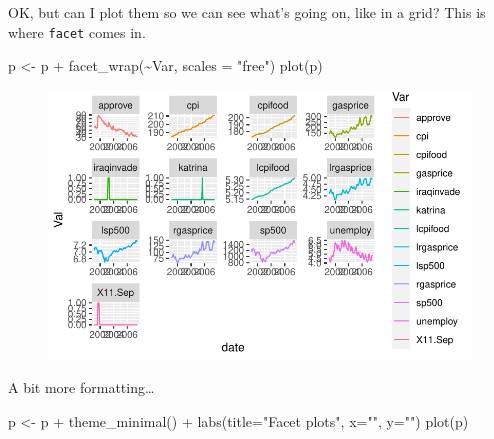 \documentclass[
  letterpaper,
]{book}
\newenvironment{Shaded}{\begin{snugshade}}{\end{snugshade}}
\newcommand{\AttributeTok}[1]{\textcolor[rgb]{0.40,0.45,0.13}{#1}}
\newcommand{\FunctionTok}[1]{\textcolor[rgb]{0.28,0.35,0.67}{#1}}
\newcommand{\NormalTok}[1]{\textcolor[rgb]{0.00,0.23,0.31}{#1}}
\newcommand{\OtherTok}[1]{\textcolor[rgb]{0.00,0.23,0.31}{#1}}
\newcommand{\SpecialCharTok}[1]{\textcolor[rgb]{0.37,0.37,0.37}{#1}}
\newcommand{\StringTok}[1]{\textcolor[rgb]{0.13,0.47,0.30}{#1}}
\begin{document}
OK, but can I plot them so we can see what's going on, like in a grid?
This is where \texttt{facet} comes in.

\begin{Shaded}
\begin{Highlighting}[]
\NormalTok{p  }\OtherTok{\textless{}{-}}\NormalTok{ p }\SpecialCharTok{+}
  \FunctionTok{facet\_wrap}\NormalTok{(}\SpecialCharTok{\textasciitilde{}}\NormalTok{Var, }\AttributeTok{scales =} \StringTok{"free"}\NormalTok{)}
\FunctionTok{plot}\NormalTok{(p)}
\end{Highlighting}
\end{Shaded}

\begin{figure}[H]

{\centering \includegraphics{Appendix1_files/figure-pdf/unnamed-chunk-10-1.pdf}

}

\end{figure}

A bit more formatting\ldots{}

\begin{Shaded}
\begin{Highlighting}[]
\NormalTok{p  }\OtherTok{\textless{}{-}}\NormalTok{ p }\SpecialCharTok{+}
  \FunctionTok{theme\_minimal}\NormalTok{() }\SpecialCharTok{+} 
  \FunctionTok{labs}\NormalTok{(}\AttributeTok{title=}\StringTok{"Facet plots"}\NormalTok{, }\AttributeTok{x=}\StringTok{""}\NormalTok{, }\AttributeTok{y=}\StringTok{""}\NormalTok{)}
\FunctionTok{plot}\NormalTok{(p)}
\end{Highlighting}
\end{Shaded}
\end{document}
